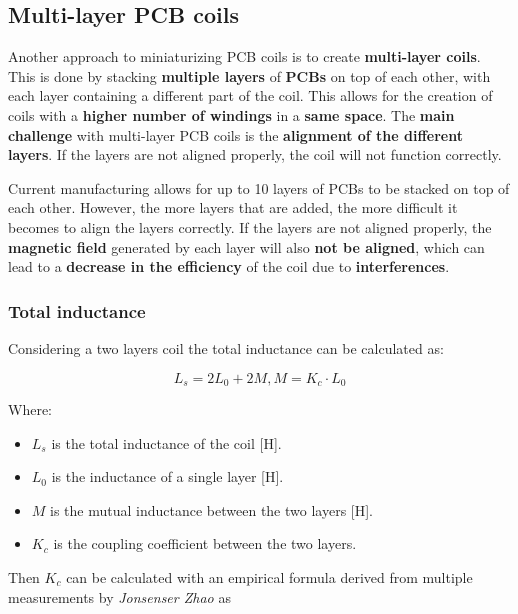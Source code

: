 \subsection{Multi-layer PCB coils}
Another approach to miniaturizing PCB coils is to create \textbf{multi-layer coils}. 
This is done by stacking \textbf{multiple layers} of \textbf{PCBs} on top of each other, with each layer containing a different part of the coil. This allows for the creation of coils with a \textbf{higher number of windings} in a \textbf{same space}. The \textbf{main challenge} with multi-layer PCB coils is the \textbf{alignment of the different layers}. If the layers are not aligned properly, the coil will not function correctly.

Current manufacturing allows for up to 10 layers of PCBs to be stacked on top of each other. However, the more layers that are added, the more difficult it becomes to align the layers correctly.
If the layers are not aligned properly, the \textbf{magnetic field} generated by each layer will also \textbf{not be aligned}, which can lead to a \textbf{decrease in the efficiency} of the coil due to \textbf{interferences}.


\subsubsection{Total inductance}
\begin{samepage}
    Considering a two layers coil the total inductance can be calculated as:
    \nopagebreak

    \begin{equation*}
        L_s = 2L_0 + 2M,   M = K_c \cdot L_0
    \end{equation*}
    \nopagebreak

    Where:
    \begin{itemize}
        \item \( L_s \) is the total inductance of the coil [H].
        \item \( L_0 \) is the inductance of a single layer [H].
        \item \( M \) is the mutual inductance between the two layers [H].
        \item \( K_c \) is the coupling coefficient between the two layers.
    \end{itemize}
\end{samepage}

    Then $K_c$ can be calculated with an empirical formula derived from multiple measurements by \textit{Jonsenser Zhao} \cite{Multilayer_spiral_inductors} as

